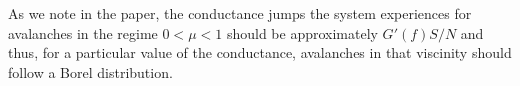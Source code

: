 \documentclass[aps,prl,reprint,groupedaddress]{revtex4-1}
\begin{document}
As we note in the paper, the conductance jumps the system experiences for avalanches in the regime $0<\mu < 1$ should be approximately $G'(f)S/N$ and thus, for a particular value of the conductance, avalanches in that viscinity should follow a Borel distribution.

%



%
\end{document}
